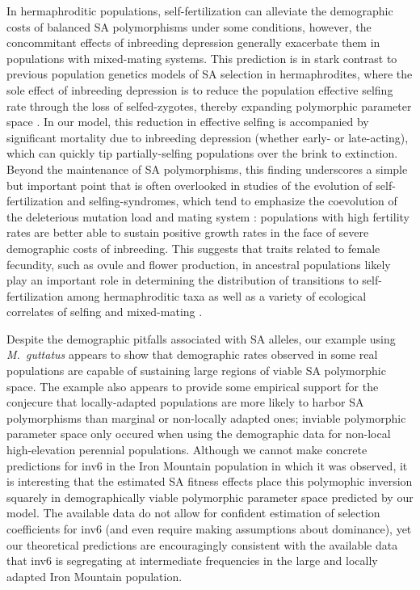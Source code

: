 \documentclass[11pt]{article}
\begin{document}
In hermaphroditic populations, self-fertilization can alleviate the demographic costs of balanced SA polymorphisms under some conditions, however, the concommitant effects of inbreeding depression generally exacerbate them in populations with mixed-mating systems. This prediction is in stark contrast to previous population genetics models of SA selection in hermaphrodites, where the sole effect of inbreeding depression is to reduce the population effective selfing rate through the loss of selfed-zygotes, thereby expanding polymorphic parameter space \citep{JordanConnallon2014, Olito2017}. In our model, this reduction in effective selfing is accompanied by significant mortality due to inbreeding depression (whether early- or late-acting), which can quickly tip partially-selfing populations over the brink to extinction. Beyond the maintenance of SA polymorphisms, this finding underscores a simple but important point that is often overlooked in studies of the evolution of self-fertilization and selfing-syndromes, which tend to emphasize the coevolution of the deleterious mutation load and mating system \citep[e.g.,][]{Charlesworth1987, LandeSchemske1985, Goodwillie2005}: populations with high fertility rates are better able to sustain positive growth rates in the face of severe demographic costs of inbreeding. This suggests that traits related to female fecundity, such as ovule and flower production, in ancestral populations likely play an important role in determining the distribution of transitions to self-fertilization among hermaphroditic taxa as well as a variety of ecological correlates of selfing and mixed-mating \citep{Goodwillie2005,Igic2006,Grossenbacher2015}.

Despite the demographic pitfalls associated with SA alleles, our example using {\itshape M.~guttatus} appears to show that demographic rates observed in some real populations are capable of sustaining large regions of viable SA polymorphic space. The example also appears to provide some empirical support for the conjecure that locally-adapted populations are more likely to harbor SA polymorphisms than marginal or non-locally adapted ones; inviable polymorphic parameter space only occured when using the demographic data for non-local high-elevation perennial populations. Although we cannot make concrete predictions for inv6 in the Iron Mountain population in which it was observed, it is interesting that the estimated SA fitness effects place this polymophic inversion squarely in demographically viable polymorphic parameter space predicted by our model. The available data do not allow for confident estimation of selection coefficients for inv6 (and even require making assumptions about dominance), yet our theoretical predictions are encouragingly consistent with the available data that inv6 is segregating at intermediate frequencies in the large and locally adapted Iron Mountain population. 
\end{document}
